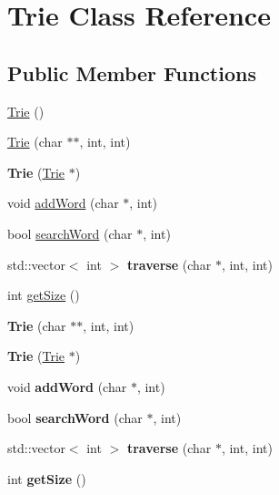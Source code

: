 \hypertarget{class_trie}{}\section{Trie Class Reference}
\label{class_trie}
\subsection*{Public Member Functions}
\begin{DoxyCompactItemize}
\item 
\hyperlink{class_trie_a6af57e9f25d0d0a2d59eea5a4a802908}{Trie} ()
\item 
\hyperlink{class_trie_a5168ff08df4d3dd0255c24167bfdc563}{Trie} (char $\ast$$\ast$, int, int)
\item 
\mbox{\label{class_trie_a7d757164056d7e42833fa06807b4b957}} 
{\bfseries Trie} (\hyperlink{class_trie}{Trie} $\ast$)
\item 
void \hyperlink{class_trie_ad793716c7d7e99240d6b3fa5fd1a4ff8}{add\+Word} (char $\ast$, int)
\item 
bool \hyperlink{class_trie_a3760a51720b288a6628360008977de6f}{search\+Word} (char $\ast$, int)
\item 
\mbox{\label{class_trie_ab69ae6a49b6346bf0cdc2589e388a179}} 
std\+::vector$<$ int $>$ {\bfseries traverse} (char $\ast$, int, int)
\item 
int \hyperlink{class_trie_aaf9bd72bfad7fa2ecfe47b7a69c05c51}{get\+Size} ()
\item 
\mbox{\label{class_trie_a5168ff08df4d3dd0255c24167bfdc563}} 
{\bfseries Trie} (char $\ast$$\ast$, int, int)
\item 
\mbox{\label{class_trie_a7d757164056d7e42833fa06807b4b957}} 
{\bfseries Trie} (\hyperlink{class_trie}{Trie} $\ast$)
\item 
\mbox{\label{class_trie_ad793716c7d7e99240d6b3fa5fd1a4ff8}} 
void {\bfseries add\+Word} (char $\ast$, int)
\item 
\mbox{\label{class_trie_a3760a51720b288a6628360008977de6f}} 
bool {\bfseries search\+Word} (char $\ast$, int)
\item 
\mbox{\label{class_trie_a7762c170d018ac4fab93a1bacf9f29aa}} 
std\+::vector$<$ int $>$ {\bfseries traverse} (char $\ast$, int, int)
\item 
\mbox{\label{class_trie_aaf9bd72bfad7fa2ecfe47b7a69c05c51}} 
int {\bfseries get\+Size} ()
\end{DoxyCompactItemize}


